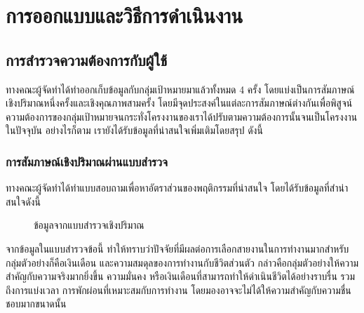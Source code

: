 \chapter{การออกแบบและวิธีการดำเนินงาน}


\section{การสำรวจความต้องการกับผู้ใช้}
ทางคณะผู้จัดทำได้ทำออกเก็บข้อมูลกับกลุ่มเป้าหมายมาแล้วทั้งหมด 4 ครั้ง โดยแบ่งเป็นการสัมภาษณ์เชิงปริมาณหนึ่งครั้งและเชิงคุณภาพสามครั้ง  โดยมีจุดประสงค์ในแต่ละการสัมภาษณ์ต่างกันเพื่อพิสูจน์ความต้องการของกลุ่มเป้าหมายจนกระทั่งโครงงานของเราได้ปรับตามความต้องการนั้นจนเป็นโครงงานในปัจจุบัน อย่างไรก็ตาม เรายังได้รับข้อมูลที่น่าสนใจเพิ่มเติมโดยสรุป ดังนี้

\subsection{การสัมภาษณ์เชิงปริมาณผ่านแบบสำรวจ}
ทางคณะผู้จัดทำได้ทำแบบสอบถามเพื่อหาอัตราส่วนของพฤติกรรมที่น่าสนใจ โดยได้รับข้อมูลที่สำน่าสนใจดังนี้
\begin{figure}[!h]\centering
    \setlength{\fboxrule}{0.2mm} %
    \setlength{\fboxsep}{0.5cm}
    \caption{ข้อมูลจากแบบสำรวจเชิงปริมาณ}\label{fig:insightPoll}
\end{figure}
จากข้อมูลในแบบสำรวจข้อนี้ ทำให้ทราบว่าปัจจัยที่มีผลต่อการเลือกสายงานในการทำงานมากสำหรับกลุ่มตัวอย่างก็คือเงินเดือน และความสมดุลของการทำงานกับชีวิตส่วนตัว กล่าวคือกลุ่มตัวอย่างให้ความสำคัญกับความจริงมากยิ่งขึ้น ความมั่นคง หรือเงินเดือนที่สามารถทำให้ดำเนินชีวิตได้อย่างราบรื่น รวมถึงการแบ่งเวลา การพักผ่อนที่เหมาะสมกับการทำงาน โดยมองอาจจะไม่ได้ให้ความสำคัญกับความชื่นชอบมากขนาดนั้น

